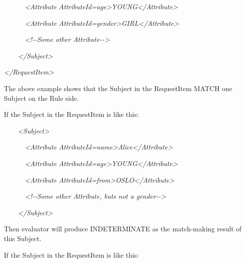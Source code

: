 \documentclass{article}
\begin{document}
{\itshape\color{black}
\ \ \ \ \ \ {\textless}Attribute
AttributeId={\textquotedbl}age{\textquotedbl}{\textgreater}YOUNG{\textless}/Attribute{\textgreater}}

{\itshape\color{black}
\ \ \ \ \ \ {\textless}Attribute
AttributeId={\textquotedbl}gender{\textquotedbl}{\textgreater}GIRL{\textless}/Attribute{\textgreater}}

{\itshape\color{black}
\ \ \ \ \ \ {\textless}!-{}-Some other Attribute-{}-{\textgreater}}

{\itshape\color{black}
\ \ \ \ {\textless}/Subject{\textgreater}}

{\itshape\color{black}
{\textless}/RequestItem{\textgreater}}

{\color{black}
The above example shows that the Subject in the RequestItem
{\textquotedbl}MATCH{\textquotedbl} one Subject on the Rule side.}

{\color{black}
If the Subject in the RequestItem is like this:}

{\itshape\color{black}
\ \ \ \ {\textless}Subject{\textgreater}}

{\itshape\color{black}
\ \ \ \ \ \ {\textless}Attribute
AttributeId={\textquotedbl}name{\textquotedbl}{\textgreater}Alice{\textless}/Attribute{\textgreater}}

{\itshape\color{black}
\ \ \ \ \ \ {\textless}Attribute
AttributeId={\textquotedbl}age{\textgreater}YOUNG{\textless}/Attribute{\textgreater}}

{\itshape\color{black}
\ \ \ \ \ \ {\textless}Attribute
AttributeId={\textquotedbl}from{\textquotedbl}{\textgreater}OSLO{\textless}/Attribute{\textgreater}}

{\itshape\color{black}
\ \ \ \ \ \ {\textless}!-{}-Some other Attribute, buts not a
{\textquotedbl}gender{\textquotedbl}-{}-{\textgreater}}

{\itshape\color{black}
\ \ \ \ {\textless}/Subject{\textgreater}}

{\color{black}
Then evaluator will produce INDETERMINATE as the match-making result of
this Subject.}

{\color{black}
If the Subject in the RequestItem is like this:}
\end{document}
